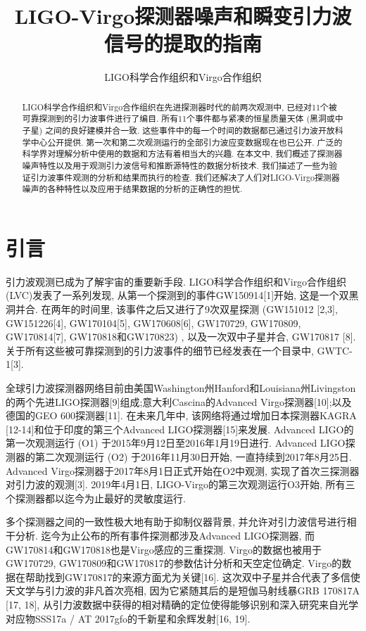 \documentclass[a4paper]{\documentclassname}
\title{LIGO-Virgo探测器噪声和瞬变引力波信号的提取的指南}
\author{LIGO科学合作组织和Virgo合作组织}
\date{}
\theoremstyle{definition}
\begin{document}
\maketitle

\begin{abstract}
    LIGO科学合作组织和Virgo合作组织在先进探测器时代的前两次观测中, 已经对11个被可靠探测到的引力波事件进行了编目. 所有11个事件都与紧凑的恒星质量天体 (黑洞或中子星) 之间的良好建模并合一致. 这些事件中的每一个时间的数据都已通过引力波开放科学中心公开提供. 第一次和第二次观测运行的全部引力波应变数据现在也已公开. 广泛的科学界对理解分析中使用的数据和方法有着相当大的兴趣. 在本文中, 我们概述了探测器噪声特性以及用于观测引力波信号和推断源特性的数据分析技术. 我们描述了一些为验证引力波事件观测的分析和结果而执行的检查. 我们还解决了人们对LIGO-Virgo探测器噪声的各种特性以及应用于结果数据的分析的正确性的担忧. 
\end{abstract}

\section{引言}

引力波观测已成为了解宇宙的重要新手段. LIGO科学合作组织和Virgo合作组织(LVC)发表了一系列发现, 从第一个探测到的事件GW150914[1]开始, 这是一个双黑洞并合. 在两年的时间里, 该事件之后又进行了9次双星探测 (GW151012 [2,3], GW151226[4], GW170104[5], GW170608[6], GW170729, GW170809, GW170814[7], GW170818和GW170823) , 以及一次双中子星并合, GW170817 [8]. 关于所有这些被可靠探测到的引力波事件的细节已经发表在一个目录中, GWTC-1[3]. 

全球引力波探测器网络目前由美国Washington州Hanford和Louisiana州Livingston的两个先进LIGO探测器[9]组成;意大利Cascina的Advanced Virgo探测器[10];以及德国的GEO 600探测器[11]. 在未来几年中, 该网络将通过增加日本探测器KAGRA [12-14]和位于印度的第三个Advanced LIGO探测器[15]来发展. Advanced LIGO的第一次观测运行 (O1) 于2015年9月12日至2016年1月19日进行. Advanced LIGO探测器的第二次观测运行 (O2) 于2016年11月30日开始, 一直持续到2017年8月25日. Advanced Virgo探测器于2017年8月1日正式开始在O2中观测, 实现了首次三探测器对引力波的观测[3]. 2019年4月1日, LIGO-Virgo的第三次观测运行O3开始, 所有三个探测器都以迄今为止最好的灵敏度运行. 

多个探测器之间的一致性极大地有助于抑制仪器背景, 并允许对引力波信号进行相干分析. 迄今为止公布的所有事件探测都涉及Advanced LIGO探测器, 而GW170814和GW170818也是Virgo感应的三重探测. Virgo的数据也被用于GW170729, GW170809和GW170817的参数估计分析和天空定位确定. Virgo的数据在帮助找到GW170817的来源方面尤为关键[16]. 这次双中子星并合代表了多信使天文学与引力波的非凡首次亮相, 因为它紧随其后的是短伽马射线暴GRB 170817A [17,  18], 从引力波数据中获得的相对精确的定位使得能够识别和深入研究来自光学对应物SSS17a / AT 2017gfo的千新星和余辉发射[16,  19]. 
\end{document}

